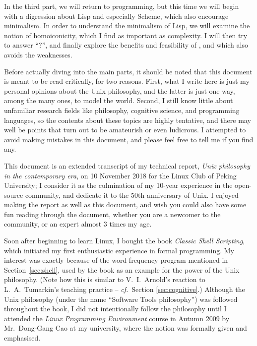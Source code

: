 \documentclass{article}
\newcommand*{\cf}{\emph{cf.}}
\begin{document}
In the third part, we will return to programming, but this time we will begin
with a digression about Lisp and especially Scheme, which also encourage
minimalism.  In order to understand the minimalism of Lisp, we will examine
the notion of homoiconicity, which I find as important as complexity.  I will
then try to answer ``?'', and finally explore the benefits and feasibility of
, and which also avoids the weaknesses.

Before actually diving into the main parts, it should be noted that this
document is meant to be read critically, for two reasons.  First, what I write
here is just my personal opinions about the Unix philosophy, and the latter
is just one way, among the many ones, to model the world.  Second, I still
know little about unfamiliar research fields like philosophy, cognitive
science, and programming languages, so the contents about these topics are
highly tentative, and there may well be points that turn out to be amateurish
or even ludicrous.  I attempted to avoid making mistakes in this document,
and please feel free to tell me if you find any.

This document is an extended transcript of my technical report,
\emph{Unix philosophy in the contemporary era}, on
10 November 2018 for the Linux Club of Peking University; I consider it
as the culmination of my 10-year experience in the open-source community,
and dedicate it to the 50th anniversary of Unix.
I enjoyed making the report as well as this document, and wish you
could also have some fun reading through the document, whether you
are a newcomer to the community, or an expert almost 3 times my age.





\newpart
\printbibliography[heading = bibintoc, title = References]
\newpart
{}\label{sec:afterword}

Soon after beginning to learn Linux, I bought the book \emph{Classic Shell
Scripting}, which initiated my first enthusiastic experience in formal
programming.  My interest was exactly because of the word frequency program
mentioned in Section~\ref{sec:shell}, used by the book as an example for the
power of the Unix philosophy.  (Note how this is similar to V.~I.\ Arnold's
reaction to L.~A.\ Tumarkin's teaching practice -- \cf~Section
\ref{sec:cognitive}.)  Although the Unix philosophy (under the name
``Software Tools philosophy'') was followed throughout the book, I did
not intentionally follow the philosophy until I attended the \emph{Linux
Programming Environment} course in Autumn 2009 by Mr.\ Dong-Gang Cao
at my university, where the notion was formally given and emphasised.
\end{document}
